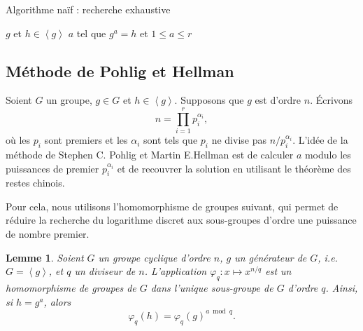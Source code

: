 \documentclass[a4paper, titlepage]{article}
\newtheorem{lemm}[theo]{Lemme}
\theoremstyle{definition}
\theoremstyle{remark}
\def\gen #1{\left\langle#1\right\rangle}
\begin{document}
\begin{algorithm}[h]
\caption{Algorithme naïf : recherche exhaustive}
\label{algoLogDiscretNaif}
\begin{algorithmic}[1]
\REQUIRE $g$ et $h \in \gen{g}$
\ENSURE $a$ tel que $g^a = h$ et $1 \leqslant a \leqslant r$
\ENDWHILE
{}
\end{algorithmic}
\end{algorithm}

\subsection{Méthode de Pohlig et Hellman}
\label{methodePohligHellman}
Soient $G$ un groupe, $g\in G$ et $h \in \gen{g}$. Supposons que $g$ est d'ordre $n$. \'Ecrivons $$n = \prod_{i=1}^r p_i^{\alpha_i},$$
où les $p_i$ sont premiers et les $\alpha_i$ sont tels que $p_i$ ne divise pas $n/p_i^{\alpha_i}$.
L'idée de la méthode de Stephen C. Pohlig et Martin E.Hellman \cite{pohligHellman1978} est de calculer $a$ modulo les puissances de premier $p_i^{\alpha_i}$ et de recouvrer la solution en utilisant le théorème des restes chinois.

Pour cela, nous utilisons l'homomorphisme de groupes suivant, qui permet de réduire la recherche du logarithme discret aux sous-groupes d'ordre une puissance de nombre premier.

\begin{lemm}
Soient $G$ un groupe cyclique d'ordre $n$, $g$ un générateur de $G$, i.e. $G = \gen{g}$, et $q$ un diviseur de $n$. L'application $\varphi_q : x \mapsto x^{n/q}$ est un homomorphisme de groupes de $G$ dans l'unique sous-groupe de $G$ d'ordre $q$. Ainsi, si $h = g^a$, alors $$\varphi_q(h) = \varphi_q(g)^{a \bmod{q}}.$$
\end{lemm}
\end{document}
